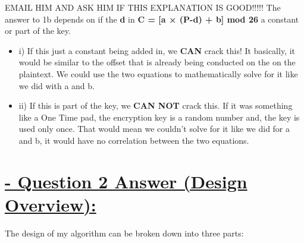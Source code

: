 \documentclass{article}
\begin{document}
EMAIL HIM AND ASK HIM IF THIS EXPLANATION IS GOOD!!!!!
\fi
The answer to 1b depends on if the \textbf{d} in \textbf{C = [a × (P-d) + b] mod 26} a constant or part of the key.
\begin{itemize}
	\item i) If this just a constant being added in, we \textbf{CAN} crack this! It basically, it would be similar to the offset that is already being conducted on the on the plaintext. We could use the two equations to mathematically solve for it like we did with a and b.

	\item ii) If this is part of the key, we \textbf{CAN NOT} crack this. If it was something like a One Time pad, the encryption key is a random number and, the key is used only once. That would mean we couldn't solve for it like we did for a and b, it would have no correlation between the two equations. 
\end{itemize}

\section{\underline{ - Question 2 Answer (Design Overview):}}
The design of my algorithm can be broken down into three parts: 
\end{document}
